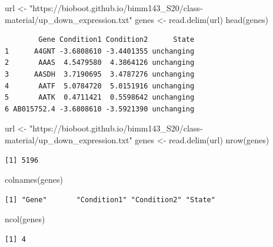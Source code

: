 \documentclass[
  letterpaper,
  DIV=11,
  numbers=noendperiod]{scrartcl}
\newenvironment{Shaded}{\begin{snugshade}}{\end{snugshade}}
\newcommand{\FunctionTok}[1]{\textcolor[rgb]{0.28,0.35,0.67}{#1}}
\newcommand{\NormalTok}[1]{\textcolor[rgb]{0.00,0.23,0.31}{#1}}
\newcommand{\OtherTok}[1]{\textcolor[rgb]{0.00,0.23,0.31}{#1}}
\newcommand{\StringTok}[1]{\textcolor[rgb]{0.13,0.47,0.30}{#1}}
\begin{document}
\begin{Shaded}
\begin{Highlighting}[]
\NormalTok{url }\OtherTok{\textless{}{-}} \StringTok{"https://bioboot.github.io/bimm143\_S20/class{-}material/up\_down\_expression.txt"}
\NormalTok{genes }\OtherTok{\textless{}{-}} \FunctionTok{read.delim}\NormalTok{(url)}
\FunctionTok{head}\NormalTok{(genes)}
\end{Highlighting}
\end{Shaded}

\begin{verbatim}
        Gene Condition1 Condition2      State
1      A4GNT -3.6808610 -3.4401355 unchanging
2       AAAS  4.5479580  4.3864126 unchanging
3      AASDH  3.7190695  3.4787276 unchanging
4       AATF  5.0784720  5.0151916 unchanging
5       AATK  0.4711421  0.5598642 unchanging
6 AB015752.4 -3.6808610 -3.5921390 unchanging
\end{verbatim}

\begin{Shaded}
\begin{Highlighting}[]
\NormalTok{url }\OtherTok{\textless{}{-}} \StringTok{"https://bioboot.github.io/bimm143\_S20/class{-}material/up\_down\_expression.txt"}
\NormalTok{genes }\OtherTok{\textless{}{-}} \FunctionTok{read.delim}\NormalTok{(url)}
\FunctionTok{nrow}\NormalTok{(genes)}
\end{Highlighting}
\end{Shaded}

\begin{verbatim}
[1] 5196
\end{verbatim}

\begin{Shaded}
\begin{Highlighting}[]
\FunctionTok{colnames}\NormalTok{(genes)}
\end{Highlighting}
\end{Shaded}

\begin{verbatim}
[1] "Gene"       "Condition1" "Condition2" "State"     
\end{verbatim}

\begin{Shaded}
\begin{Highlighting}[]
\FunctionTok{ncol}\NormalTok{(genes)}
\end{Highlighting}
\end{Shaded}

\begin{verbatim}
[1] 4
\end{verbatim}
\end{document}
